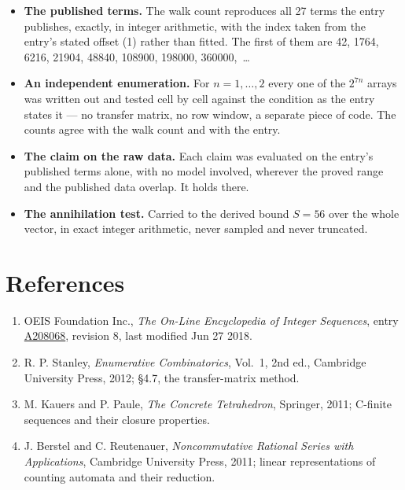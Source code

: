 \documentclass[11pt]{article}
\theoremstyle{definition}
\begin{document}
\begin{itemize}

\item {\bfseries The published terms.} The walk count reproduces all 27 terms the entry publishes, exactly, in integer arithmetic, with the index taken from the entry's stated offset (1) rather than fitted. The first of them are 42, 1764, 6216, 21904, 48840, 108900, 198000, 360000,~\dots

\item {\bfseries An independent enumeration.} For $n = 1,\dots,2$ every one of the $2^{7n}$ arrays was written out and tested cell by cell against the condition as the entry states it --- no transfer matrix, no row window, a separate piece of code. The counts agree with the walk count and with the entry.

\item {\bfseries The claim on the raw data.} Each claim was evaluated on the entry's published terms alone, with no model involved, wherever the proved range and the published data overlap. It holds there.

\item {\bfseries The annihilation test.} Carried to the derived bound $S = 56$ over the whole vector, in exact integer arithmetic, never sampled and never truncated.

\end{itemize}

\section{References}

\begin{enumerate}

\item OEIS Foundation Inc., \emph{The On-Line Encyclopedia of Integer Sequences}, entry \href{https://oeis.org/A208068}{A208068}, revision 8, last modified Jun 27 2018.

\item R. P. Stanley, \emph{Enumerative Combinatorics}, Vol.~1, 2nd ed., Cambridge University Press, 2012; \S4.7, the transfer-matrix method.

\item M. Kauers and P. Paule, \emph{The Concrete Tetrahedron}, Springer, 2011; C-finite sequences and their closure properties.

\item J. Berstel and C. Reutenauer, \emph{Noncommutative Rational Series with Applications}, Cambridge University Press, 2011; linear representations of counting automata and their reduction.

\end{enumerate}
\end{document}
